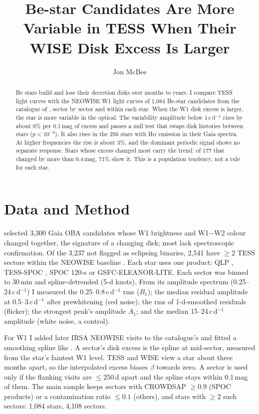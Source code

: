\documentclass{aastex701}
\begin{document}
\title{Be-star Candidates Are More Variable in TESS When Their WISE Disk Excess Is Larger}

\author[orcid=0009-0000-7524-4470]{Jon McBee}

\begin{abstract}
Be stars build and lose their decretion disks over months to years. I compare TESS light curves with the NEOWISE W1 light curves of
1,084 Be-star candidates from the catalogue of \citet{Jia2026}, sector by sector and within each
star. When the W1 disk excess is larger, the star is more variable in the optical. The
variability amplitude below 1\,c\,d$^{-1}$ rises by about 8\% per 0.1\,mag of excess and passes a
null test that swaps disk histories between stars ($p<10^{-4}$). It also rises in the 256 stars
with H$\alpha$ emission in their Gaia spectra. At higher frequencies the rise is about 3\%, and
the dominant periodic signal shows no separate response. Stars whose excess changed most carry
the trend: of 177 that changed by more than 0.4\,mag, 71\% show it. This is a population
tendency, not a rule for each star.
\end{abstract}


\section{Data and Method}

\citet{Jia2026} selected 3,300 Gaia OBA candidates whose W1 brightness and W1$-$W2 colour changed
together, the signature of a changing disk; most lack spectroscopic confirmation. Of the
3,237 not flagged as eclipsing binaries, 2,541 have $\geq2$ TESS sectors within the NEOWISE
baseline \citep{Wright2010,Mainzer2014}. Each star uses one product: QLP \citep{Huang2020},
TESS-SPOC \citep{Caldwell2020}, SPOC 120-s or GSFC-ELEANOR-LITE. Each sector was binned to 30\,min and spline-detrended (5-d knots). From its amplitude
spectrum (0.25--24\,c\,d$^{-1}$) I measured the 0.25--0.8\,c\,d$^{-1}$ rms ($B_1$); the median
residual amplitude at 0.5--3\,c\,d$^{-1}$ after prewhitening (red noise); the rms of 1-d-smoothed
residuals (flicker); the strongest peak's amplitude $A_1$; and the median 15--24\,c\,d$^{-1}$
amplitude (white noise, a control).

For W1 I added later IRSA NEOWISE visits to the catalogue's and fitted a smoothing spline like \citet{Jia2026}. A sector's disk excess is the spline at mid-sector,
measured from the star's faintest W1 level. TESS and WISE view a star about three months apart, so
the interpolated excess biases $\beta$ towards zero. A sector is used only if the flanking
visits are $\leq250$\,d apart and the spline stays within 0.1\,mag of them. The main
sample keeps sectors with CROWDSAP $\geq0.9$ (SPOC products) or a contamination ratio $\leq0.1$
(others), and stars with $\geq2$ such sectors: 1,084 stars, 4,108 sectors.
\end{document}
